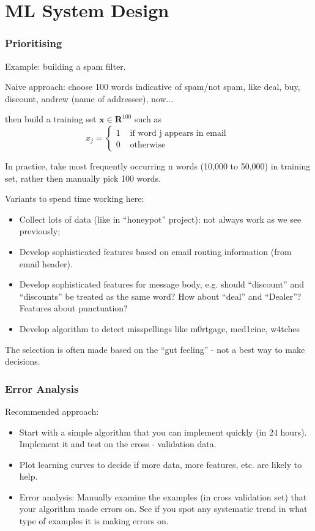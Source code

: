 \documentclass{scrartcl}
\begin{document}
\section{ML System Design}
\label{sec:11}

\subsubsection{Prioritising}
\label{sec:11-1}
Example: building a spam filter.

Naive approach: choose 100 words indicative of spam/not spam, like
deal, buy, discount, andrew (name of addressee), now...

then build a training set $\mathbf{x} \in \mathbf{R}^{100}$ such as \[
x_j = \left\{
  \begin{array}{ll}
    1 & \textrm{ if word j appears in email } \\
    0 & \textrm{ otherwise}
  \end{array} \right. \]

In practice, take most frequently occurring n words (10,000 to 50,000)
in training set, rather then manually pick 100 words.

Variants to spend time working here:
\begin{itemize}
\item Collect lots of data (like in ``honeypot'' project): not always
  work as we see previously;
\item Develop sophisticated features based on email routing
  information (from email header).
\item Develop sophisticated features for message body, e.g. should
  ``discount'' and ``discounts'' be treated as the same word? How
  about ``deal'' and ``Dealer''? Features about punctuation?
\item Develop algorithm to detect misspellings like m0rtgage,
  med1cine, w4tches
\end{itemize}
The selection is often made based on the ``gut feeling'' - not a best
way to make decisions.

\subsubsection{Error Analysis}
\label{sec:11-2}
Recommended approach:
\begin{itemize}
\item Start with a simple algorithm that you can implement quickly (in
  24 hours). Implement it and test on the cross - validation data.
\item Plot learning curves to decide if more data, more features, etc.
  are likely to help.
\item Error analysis: Manually examine the examples (in cross
  validation set) that your algorithm made errors on. See if you spot
  any systematic trend in what type of examples it is making errors
  on.
\end{itemize}
\end{document}
